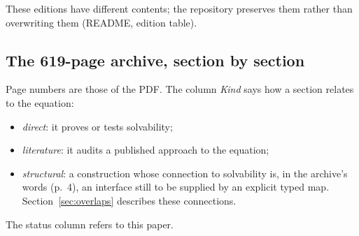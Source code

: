 These editions have different contents; the repository preserves them rather than overwriting them (README, edition table).

\subsection{The 619-page archive, section by section}\label{ssec:archive}

Page numbers are those of the PDF. The column \emph{Kind} says how a section relates to the equation:
\begin{itemize}
\item \emph{direct}: it proves or tests solvability;
\item \emph{literature}: it audits a published approach to the equation;
\item \emph{structural}: a construction whose connection to solvability is, in the archive's words (p.~4), an interface still to be supplied by an explicit typed map. Section~\ref{sec:overlaps} describes these connections.
\end{itemize}
The status column refers to this paper.

